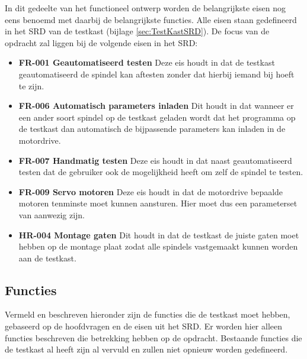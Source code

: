In dit gedeelte van het functioneel ontwerp worden de belangrijkste eisen nog eens benoemd met daarbij de belangrijkste functies. Alle eisen staan gedefineerd in het SRD van de testkast (bijlage \ref{sec:TestKastSRD}). De focus van de opdracht zal liggen bij de volgende eisen in het \gls{SRD}:

\begin{itemize}
	\item \textbf{FR-001 Geautomatiseerd testen} Deze eis houdt in dat de testkast geautomatiseerd de spindel kan aftesten zonder dat hierbij iemand bij hoeft te zijn.
	\item \textbf{FR-006 Automatisch parameters inladen} Dit houdt in dat wanneer er een ander soort spindel op de testkast geladen wordt dat het programma op de testkast dan automatisch de bijpassende parameters kan inladen in de motordrive.
	\item \textbf{FR-007 Handmatig testen} Deze eis houdt in dat naast geautomatiseerd testen dat de gebruiker ook de mogelijkheid heeft om zelf de spindel te testen.
	\item \textbf{FR-009 Servo motoren} Deze eis houdt in dat de motordrive bepaalde motoren tenminste moet kunnen aansturen. Hier moet dus een parameterset van aanwezig zijn.
	\item \textbf{HR-004 Montage gaten} Dit houdt in dat de testkast de juiste gaten moet hebben op de montage plaat zodat alle spindels vastgemaakt kunnen worden aan de testkast.
\end{itemize} 

\newpage

\subsection{Functies}

Vermeld en beschreven hieronder zijn de functies die de testkast moet hebben, gebaseerd op de hoofdvragen en de eisen uit het \gls{SRD}. Er worden hier alleen functies beschreven die betrekking hebben op de opdracht. Bestaande functies die de testkast al heeft zijn al vervuld en zullen niet opnieuw worden gedefineerd.

